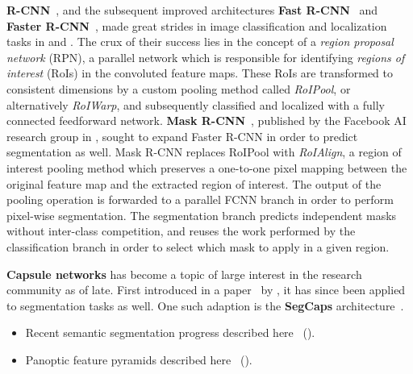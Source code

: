 \textbf{R-CNN}~\cite{r-cnn}, and the subsequent improved architectures \textbf{Fast R-CNN}~\cite{fast-r-cnn} and \textbf{Faster R-CNN}~\cite{faster-r-cnn}, made great strides in image classification and localization tasks in \citeyear{r-cnn} and \citeyear{faster-r-cnn}.
The crux of their success lies in the concept of a \textit{region proposal network} (RPN), a parallel network which is responsible for identifying \textit{regions of interest} (RoIs) in the convoluted feature maps.
These RoIs are transformed to consistent dimensions by a custom pooling method called \textit{RoIPool}, or alternatively \textit{RoIWarp}, and subsequently classified and localized with a fully connected feedforward network.
\textbf{Mask R-CNN}~\cite{mask-r-cnn}, published by the Facebook AI research group in \citeyear{mask-r-cnn}, sought to expand Faster R-CNN in order to predict segmentation as well.
Mask R-CNN replaces RoIPool with \textit{RoIAlign}, a region of interest pooling method which preserves a one-to-one pixel mapping between the original feature map and the extracted region of interest.
The output of the pooling operation is forwarded to a parallel FCNN branch in order to perform pixel-wise segmentation.
The segmentation branch predicts independent masks without inter-class competition, and reuses the work performed by the classification branch in order to select which mask to apply in a given region.

\textbf{Capsule networks} has become a topic of large interest in the research community as of late.
First introduced in a paper~\cite{capsules} by \citeauthor{capsules}, it has since been applied to segmentation tasks as well.
One such adaption is the \textbf{SegCaps} architecture~\cite{segmentation-segcaps}.

\begin{itemize}
  \item Recent semantic segmentation progress described here~\cite{segmentation-progress} (\citeyear{segmentation-progress}).
  \item Panoptic feature pyramids described here~\cite{segmentation-panoptic-feature-pyramid} (\citeyear{segmentation-panoptic-feature-pyramid}).
\end{itemize}
